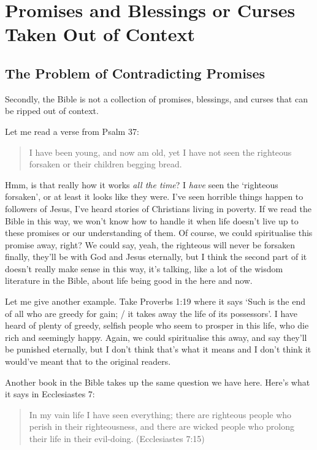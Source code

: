 \section{Promises and Blessings or Curses Taken Out of Context}

\subsection{The Problem of Contradicting Promises}

Secondly, the Bible is not a collection of promises, blessings, and curses that
can be ripped out of context.

Let me read a verse from Psalm 37:

\begin{quote}
    I have been young, and now am old, yet I have not seen the righteous
    forsaken or their children begging bread.
\end{quote}

Hmm, is that really how it works \textit{all the time}? I \textit{have} seen the
`righteous forsaken', or at least it looks like they were. I've seen horrible
things happen to followers of Jesus, I've heard stories of Christians living in
poverty. If we read the Bible in this way, we won't know how to handle it when
life doesn't live up to these promises or our understanding of them. Of course,
we could spiritualise this promise away, right? We could say, yeah, the
righteous will never be forsaken finally, they'll be with God and Jesus
eternally, but I think the second part of it doesn't really make sense in this
way, it's talking, like a lot of the wisdom literature in the Bible, about life
being good in the here and now.

Let me give another example. Take Proverbs 1:19 where it says `Such is the end
of all who are greedy for gain; / it takes away the life of its possessors'. I
have heard of plenty of greedy, selfish people who seem to prosper in this life,
who die rich and seemingly happy. Again, we could spiritualise this away, and
say they'll be punished eternally, but I don't think that's what it means and I
don't think it would've meant that to the original readers.

Another book in the Bible takes up the same question we have here. Here's what
it says in Ecclesiastes 7:

\begin{quote}
    In my vain life I have seen everything; there are righteous people who
    perish in their righteousness, and there are wicked people who prolong their
    life in their evil-doing. (Ecclesiastes 7:15)
\end{quote}

